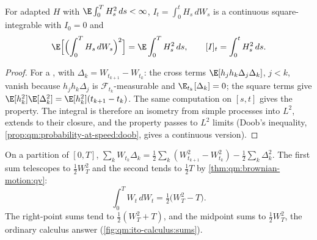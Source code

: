 \begin{theorem}\label{thm:qm:ito-calculus:isometry}
For adapted $H$ with $\E\int_0^T H_s^2\,ds < \infty$, $I_t = \int_0^t H_s\,dW_s$ is a continuous
square-integrable  with $I_0 = 0$ and
\[
\E\Bigl[\Bigl(\int_0^T H_s\,dW_s\Bigr)^2\Bigr] = \E\int_0^T H_s^2\,ds, \qquad [I]_t = \int_0^t H_s^2\,ds.
\]
\end{theorem}

\begin{proof}
For a , with $\Delta_k = W_{t_{k+1}} - W_{t_k}$: the cross terms $\E[h_jh_k\Delta_j\Delta_k]$,
$j < k$, vanish because $h_jh_k\Delta_j$ is $\mathcal F_{t_k}$-measurable and $\E_{t_k}[\Delta_k] = 0$;
the square terms give $\E[h_k^2]\E[\Delta_k^2] = \E[h_k^2](t_{k+1} - t_k)$. The same computation on
$[s, t]$ gives the  property. The integral is therefore an isometry from simple
processes into $L^2$, extends to their closure, and the  property passes to $L^2$
limits (Doob's inequality, \cref{prop:qm:probability-at-speed:doob}, gives a continuous
version).
\end{proof}

\begin{example}\label{ex:qm:ito-calculus:wdw}
On a partition of $[0, T]$, $\sum_k W_{t_k}\Delta_k = \tfrac12\sum_k(W_{t_{k+1}}^2 - W_{t_k}^2) -
\tfrac12\sum_k\Delta_k^2$. The first sum telescopes to $\tfrac12 W_T^2$ and the second tends to
$\tfrac12 T$ by \cref{thm:qm:brownian-motion:qv}:
\[
\int_0^T W_t\,dW_t = \tfrac12\bigl(W_T^2 - T\bigr).
\]
The right-point sums tend to $\tfrac12(W_T^2 + T)$, and the midpoint sums to $\tfrac12W_T^2$, the
ordinary calculus answer (\cref{fig:qm:ito-calculus:sums}).
\end{example}

